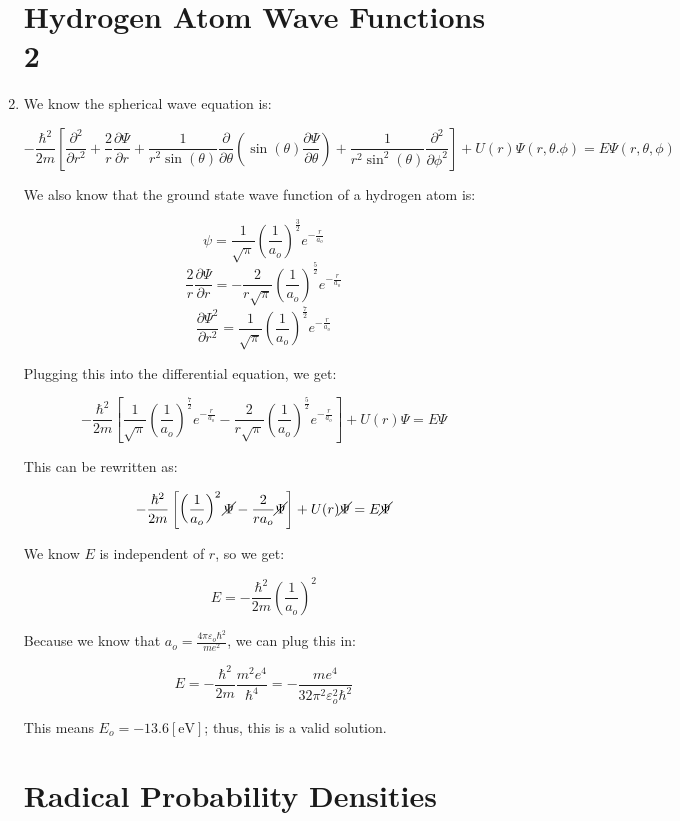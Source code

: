 \begin{enumerate}
    \section*{Hydrogen Atom Wave Functions 2}

  \item We know the spherical wave equation is:

    $$-\frac{\hbar^2}{2m}\left[ \frac{\partial^2}{\partial r^2}+\frac{2}{r}\frac{\partial \Psi}{\partial r}+\frac{1}{r^2\sin(\theta)}\frac{\partial}{\partial\theta}\left( \sin(\theta)\frac{\partial\Psi}{\partial\theta} \right)+\frac{1}{r^2\sin^2(\theta)}\frac{\partial^2}{\partial\phi^2} \right]+U(r)\Psi(r,\theta.\phi)=E\Psi(r,\theta,\phi)$$

    We also know that the ground state wave function of a hydrogen atom is:

    $$\psi=\frac{1}{\sqrt{\pi}}\left( \frac{1}{a_o} \right)^{\frac{3}{2}}e^{-\frac{r}{a_o}}$$
    $$\frac{2}{r}\frac{\partial \Psi}{\partial r}=-\frac{2}{r\sqrt{\pi}}\left( \frac{1}{a_o} \right)^{\frac{5}{2}}e^{-\frac{r}{a_o}}$$
    $$\frac{\partial\Psi^2}{\partial r^2}=\frac{1}{\sqrt{\pi}}\left( \frac{1}{a_o} \right)^{\frac{7}{2}}e^{-\frac{r}{a_o}}$$

    Plugging this into the differential equation, we get:

    $$-\frac{\hbar^2}{2m}\left[ \frac{1}{\sqrt{\pi}}\left( \frac{1}{a_o} \right)^{\frac{7}{2}}e^{-\frac{r}{a_o}}-\frac{2}{r\sqrt{\pi}}\left( \frac{1}{a_o} \right)^{\frac{5}{2}}e^{-\frac{r}{a_o}} \right]+U(r)\Psi=E\Psi$$

    This can be rewritten as:

    $$-\frac{\hbar^2}{2m}\left[ \left( \frac{1}{a_o} \right)^2\cancel{\Psi}-\frac{2}{ra_o}\cancel{\Psi} \right]+U(r)\cancel{\Psi}=E\cancel{\Psi}$$

    We know $E$ is independent of $r$, so we get:

    $$E=-\frac{\hbar^2}{2m}\left( \frac{1}{a_o} \right)^2$$

    Because we know that $a_o=\frac{4\pi\varepsilon_o\hbar^2}{me^2}$, we can plug this in:

    $$E=-\frac{\hbar^2}{2m}\frac{m^2e^4}{\hbar^4}=-\frac{me^4}{32\pi^2\varepsilon_o^2\hbar^2}$$

    This means $E_o=-13.6[\si{\eV}]$; thus, this is a valid solution.

    \section*{Radical Probability Densities}


\end{enumerate}
